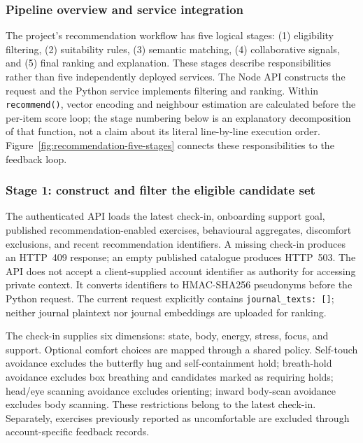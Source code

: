 \subsubsection{Pipeline overview and service integration}
\label{sec:five-stages}

The project's recommendation workflow has five logical stages: (1) eligibility filtering, (2) suitability rules, (3) semantic matching, (4) collaborative signals, and (5) final ranking and explanation. These stages describe responsibilities rather than five independently deployed services. The Node API constructs the request and the Python service implements filtering and ranking. Within \texttt{recommend()}, vector encoding and neighbour estimation are calculated before the per-item score loop; the stage numbering below is an explanatory decomposition of that function, not a claim about its literal line-by-line execution order. Figure~\ref{fig:recommendation-five-stages} connects these responsibilities to the feedback loop.

\subsubsection{Stage 1: construct and filter the eligible candidate set}
\label{sec:stage-one}

The authenticated API loads the latest check-in, onboarding support goal, published recommendation-enabled exercises, behavioural aggregates, discomfort exclusions, and recent recommendation identifiers. A missing check-in produces an HTTP~409 response; an empty published catalogue produces HTTP~503. The API does not accept a client-supplied account identifier as authority for accessing private context. It converts identifiers to HMAC-SHA256 pseudonyms before the Python request. The current request explicitly contains \texttt{journal\_texts: []}; neither journal plaintext nor journal embeddings are uploaded for ranking.

The check-in supplies six dimensions: state, body, energy, stress, focus, and support. Optional comfort choices are mapped through a shared policy. Self-touch avoidance excludes the butterfly hug and self-containment hold; breath-hold avoidance excludes box breathing and candidates marked as requiring holds; head/eye scanning avoidance excludes orienting; inward body-scan avoidance excludes body scanning. These restrictions belong to the latest check-in. Separately, exercises previously reported as uncomfortable are excluded through account-specific feedback records.


